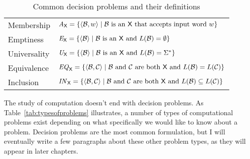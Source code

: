 \begin{table}
\centering
\caption{Common decision problems and their definitions}
\label{tab:commondecisionproblems}
\begin{tabular}{l l}
\toprule
Membership	& $\mathit{A}_{\textsf{X}} = \{\langle \mathcal{B}, w \rangle \mid \mathcal{B} \text{ is an \textsf{X} that accepts input word } w\}$ \\
Emptiness		& $\mathit{E}_{\textsf{X}} = \{\langle \mathcal{B} \rangle \mid \mathcal{B} \text{ is an \textsf{X} and } L(\mathcal{B}) = \emptyset\}$ \\
Universality	& $\mathit{U}_{\textsf{X}} = \{\langle \mathcal{B} \rangle \mid \mathcal{B} \text{ is an \textsf{X} and } L(\mathcal{B}) = \Sigma^{*}\}$ \\
Equivalence	& $\mathit{EQ}_{\textsf{X}} = \{\langle \mathcal{B}, \mathcal{C} \rangle \mid \mathcal{B} \text{ and } \mathcal{C} \text{ are both \textsf{X} and } L(\mathcal{B}) = L(\mathcal{C})\}$ \\
Inclusion		& $\mathit{IN}_{\textsf{X}} = \{\langle \mathcal{B}, \mathcal{C} \rangle \mid \mathcal{B} \text{ and } \mathcal{C} \text{ are both \textsf{X} and } L(\mathcal{B}) \subseteq L(\mathcal{C})\}$ \\
\bottomrule
\end{tabular}
\end{table}

\begin{construction}
The study of computation doesn't end with decision problems. As Table~\ref{tab:typesofproblems} illustrates, a number of types of computational problems exist depending on what specifically we would like to know about a problem. Decision problems are the most common formulation, but I will eventually write a few paragraphs about these other problem types, as they will appear in later chapters.
\end{construction}

